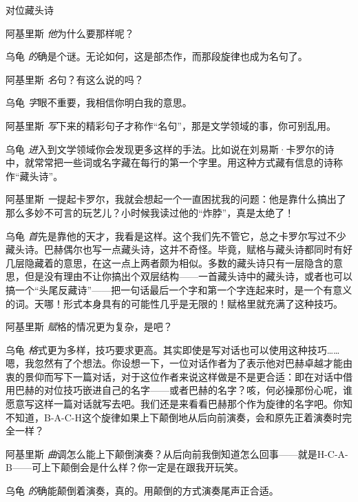 \begin{dialog}{对位藏头诗}
\begin{dialogue}
\item[阿基里斯]\emph{他}为什么要那样呢？

\item[乌龟]\emph{的}确是个谜。无论如何，这是部杰作，而那段旋律也成为名句了。

\item[阿基里斯]\emph{名}句？有这么说的吗？

\item[乌龟]\emph{字}眼不重要，我相信你明白我的意思。

\item[阿基里斯]\emph{写}下来的精彩句子才称作“名句”，那是文学领域的事，你可别乱用。

\item[乌龟]\emph{进}入到文学领域你会发现更多这样的手法。比如说在刘易斯·卡罗尔的诗中，就常常把一些词或名字藏在每行的第一个字里。用这种方式藏有信息的诗称作“藏头诗”。

\item[阿基里斯]\emph{一}提起卡罗尔，我就会想起一个一直困扰我的问题：他是靠什么搞出了那么多妙不可言的玩艺儿？小时候我读过他的“炸脖”，真是太绝了！

\item[乌龟]\emph{首}先是靠他的天才，我看是这样。这个我们先不管它，总之卡罗尔写过不少藏头诗。巴赫偶尔也写一点藏头诗，这并不奇怪。毕竟，赋格与藏头诗都同时有好几层隐藏着的意思，在这一点上两者颇为相似。多数的藏头诗只有一层隐含的意思，但是没有理由不让你搞出个双层结构——一首藏头诗中的藏头诗，或者也可以搞一个“头尾反藏诗”——把一句话最后一个字和第一个字连起来时，是一个有意义的词。天哪！形式本身具有的可能性几乎是无限的！赋格里就充满了这种技巧。

\item[阿基里斯]\emph{赋}格的情况更为复杂，是吧？

\item[乌龟]\emph{格}式更为多样，技巧要求更高。其实即使是写对话也可以使用这种技巧……嗯，我忽然有了个想法。你设想一下，一位对话作者为了表示他对巴赫卓越才能由衷的景仰而写下一篇对话，对于这位作者来说这样做是不是更合适：即在对话中借用巴赫的对位技巧嵌进自己的名字——或者巴赫的名字？咳，何必操那份心呢，谁愿意写这样一篇对话就写去吧。我们还是来看看巴赫那个作为旋律的名字吧。你知不知道，B-A-C-H这个旋律如果上下颠倒地从后向前演奏，会和原先正着演奏时完全一样？

\item[阿基里斯]\emph{曲}调怎么能上下颠倒演奏？从后向前我倒知道怎么回事——就是H-C-A-B——可上下颠倒会是什么样？你一定是在跟我开玩笑。

\item[乌龟]\emph{的}确能颠倒着演奏，真的。用颠倒的方式演奏尾声正合适。


\end{dialogue}
\end{dialog}
